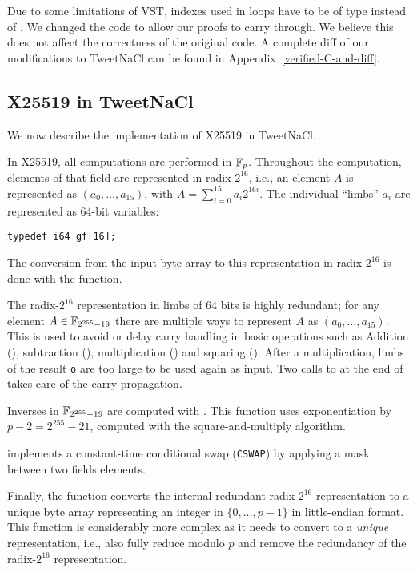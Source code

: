 Due to some limitations of VST, indexes used in  loops have to be
of type  instead of . We changed the code to allow our
proofs to carry through. We believe this does not affect the correctness of the
original code. A complete diff of our modifications to TweetNaCl can be found in
Appendix~\ref{verified-C-and-diff}.


\subsection{X25519 in TweetNaCl}
\label{subsec:X25519-TweetNaCl}

We now describe the implementation of X25519 in TweetNaCl.

In X25519, all computations are performed in $\mathbb{F}_{p}$.
Throughout the computation, elements of that field
are represented in radix $2^{16}$,
i.e., an element $A$ is represented as $(a_0,\dots,a_{15})$,
with $A = \sum_{i=0}^{15}a_i2^{16i}$.
The individual ``limbs'' $a_i$ are represented as
64-bit  variables:
\begin{lstlisting}[language=Ctweetnacl,stepnumber=0]
typedef i64 gf[16];
\end{lstlisting}

The conversion from the input byte array to this representation in radix
$2^{16}$ is done with the  function.

The radix-$2^{16}$ representation in limbs of $64$ bits is
highly redundant; for any element $A \in \mathbb{F}_{2^{255}-19}$ there are
multiple ways to represent $A$ as $(a_0,\dots,a_{15})$.
This is used to avoid or delay carry handling in basic operations such as
Addition (), subtraction (), multiplication ()
and squaring (). After a multiplication, limbs of the result
\texttt{o} are too large to be used again as input. Two calls to
 at the end of  takes care of the carry propagation.

Inverses in $\mathbb{F}_{2^{255}-19}$ are computed with .
This function uses exponentiation by $p - 2 = 2^{255}-21$,
computed with the square-and-multiply algorithm.

 implements a constant-time conditional swap (\texttt{CSWAP}) by
applying a mask between two fields elements.

Finally, the  function
converts the internal redundant radix-$2^{16}$
representation to a unique byte array representing an
integer in $\{0,\dots,p-1\}$ in little-endian format.
This function is considerably more complex as it needs to convert
to a \emph{unique} representation, i.e., also fully reduce modulo
$p$ and remove the redundancy of the radix-$2^{16}$ representation.

